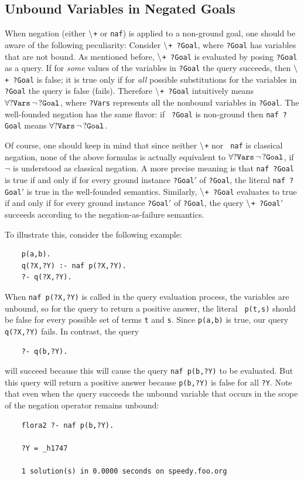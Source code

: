 \documentclass[11pt]{article}
\newcommand{\PLGNAF}{\mbox{\tt \ensuremath{\tt\backslash}+}\xspace}
\newcommand{\RULELOGNAF}{{{\tt naf}}\xspace}
\begin{document}
\subsection{Unbound Variables in Negated Goals}

When negation (either \PLGNAF or \RULELOGNAF) is applied to a non-ground goal, one
should be aware of the following peculiarity: Consider {\tt \PLGNAF\ ?Goal},
where {\tt ?Goal} has variables that are not bound. As mentioned before,
{\tt \PLGNAF\ ?Goal} is evaluated by posing {\tt ?Goal} as a query. If for
\emph{some} values of the variables in {\tt ?Goal} the query succeeds,
then {\tt \PLGNAF\ ?Goal} is false; it is true only if for \emph{all} possible
substitutions for the variables in {\tt ?Goal} the query is false
(fails). Therefore {\tt \PLGNAF\ ?Goal} intuitively means $\tt\forall
?Vars\,\neg\,?Goal$, where {\tt ?Vars} represents all the nonbound variables
in {\tt ?Goal}. The well-founded negation has the same flavor: if {\tt
  ?Goal} is non-ground then {\tt \RULELOGNAF\ ?Goal} means $\tt\forall
?Vars\,\neg\,?Goal$.

Of course, one should keep in mind that since neither {\tt \PLGNAF} nor {\tt
  \RULELOGNAF} is classical negation, none of the above formulas is actually
equivalent to $\tt\forall ?Vars\,\neg\,?Goal$, if $\neg$ is understood as
classical negation. A more precise meaning is that {\tt \RULELOGNAF\ ?Goal} is true
if and only if for every ground instance {\tt ?Goal$'$} of
{\tt ?Goal}, the literal {\tt \RULELOGNAF\ ?Goal$'$} is true in
the well-founded semantics.
Similarly, {\tt \PLGNAF\ ?Goal} evaluates to true if and
only if for every ground instance {\tt ?Goal$'$} of  {\tt ?Goal},  the query
{\tt \PLGNAF\ ?Goal$'$} succeeds according to the negation-as-failure
semantics.

To illustrate this, consider the following example:
\begin{verbatim}
    p(a,b).
    q(?X,?Y) :- naf p(?X,?Y).
    ?- q(?X,?Y).
\end{verbatim}
When {\tt naf p(?X,?Y)} is called in the query evaluation process, the variables
are unbound, so for the query to return a positive answer, the literal {\tt
  p(t,s)} should be false for every possible set of terms {\tt t} and {\tt s}.
Since {\tt p(a,b)} is true, our query {\tt q(?X,?Y)} fails. In contrast, the
query
\begin{verbatim}
    ?- q(b,?Y).  
\end{verbatim}
will succeed because this will cause the query {\tt naf p(b,?Y)} to be
evaluated. But this query will return a positive answer because {\tt p(b,?Y)}
is false for all {\tt ?Y}. Note that even when the query succeeds the
unbound variable that occurs in the scope of the negation operator remains
unbound:
\begin{verbatim}
    flora2 ?- naf p(b,?Y).  
 
    ?Y = _h1747
 
    1 solution(s) in 0.0000 seconds on speedy.foo.org
\end{verbatim}
\end{document}
